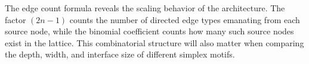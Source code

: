 The edge count formula reveals the scaling behavior of the architecture. The factor $(2n-1)$ counts the number of directed edge types emanating from each source node, while the binomial coefficient counts how many such source nodes exist in the lattice. This combinatorial structure will also matter when comparing the depth, width, and interface size of different simplex motifs.
